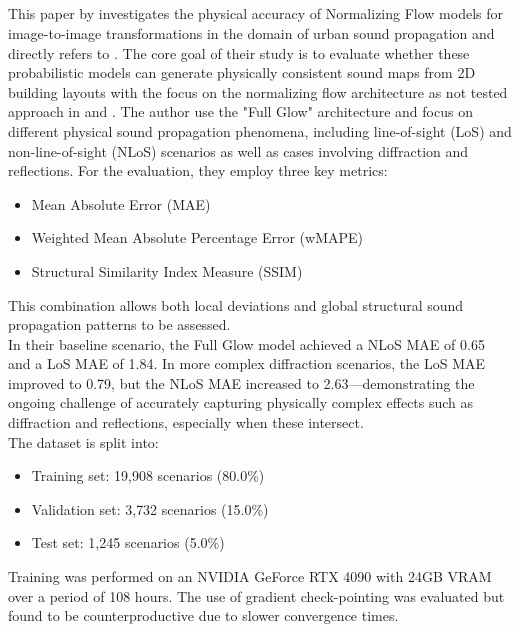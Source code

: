 		\subsection{}
			This paper by \citeauthor{achim_eckerle_evaluierung_2025} investigates the physical accuracy of Normalizing Flow models for image-to-image transformations in the domain of urban sound propagation and directly refers to . The core goal of their study is to evaluate whether these probabilistic models can generate physically consistent sound maps from 2D building layouts with the focus on the normalizing flow architecture as not tested approach in  and .
			\newpage
			The author use the "Full Glow" architecture and focus on different physical sound propagation phenomena, including line-of-sight (LoS) and non-line-of-sight (NLoS) scenarios as well as cases involving diffraction and reflections. For the evaluation, they employ three key metrics:
			\begin{itemize}
				\item Mean Absolute Error (MAE)
				\item Weighted Mean Absolute Percentage Error (wMAPE)
				\item Structural Similarity Index Measure (SSIM)
			\end{itemize}
			This combination allows both local deviations and global structural sound propagation patterns to be assessed.\\
			In their baseline scenario, the Full Glow model achieved a NLoS MAE of 0.65 and a LoS MAE of 1.84. In more complex diffraction scenarios, the LoS MAE improved to 0.79, but the NLoS MAE increased to 2.63—demonstrating the ongoing challenge of accurately capturing physically complex effects such as diffraction and reflections, especially when these intersect.\\
			The dataset is split into:
			\begin{itemize}
				\item Training set: 19{,}908 scenarios (80.0\%)
				\item Validation set: 3{,}732 scenarios (15.0\%)
				\item Test set: 1{,}245 scenarios (5.0\%)
			\end{itemize}
			Training was performed on an NVIDIA GeForce RTX 4090 with 24GB VRAM over a period of 108 hours. The use of gradient check-pointing was evaluated but found to be counterproductive due to slower convergence times.\\
